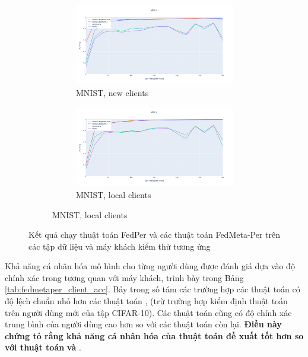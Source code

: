 \begin{figure}
    \begin{subfigure}{\textwidth}
        \centering
        \begin{subfigure}{.5\textwidth}
            \centering
            \includegraphics[width=\linewidth]{./images/mnist_per_new.png}
            \caption{MNIST, new clients}
            \label{fig:mnist_per_new}
        \end{subfigure}%
        \begin{subfigure}{.5\textwidth}
            \centering
            \includegraphics[width=\linewidth]{./images/mnist_per_old.png}
            \caption{MNIST, local clients}
            \label{fig:mnist_per_old}
        \end{subfigure}
    \end{subfigure}
    \caption{Kết quả chạy thuật toán FedPer và các thuật toán FedMeta-Per trên các tập dữ liệu và máy khách kiểm thử tương ứng}
    \label{fig:fedmetaper_acc}
\end{figure}
\clearpage
Khả năng cá nhân hóa mô hình cho từng người dùng được đánh giá dựa vào độ chính xác trong tương quan với máy khách, trình bày trong Bảng \ref{tab:fedmetaper_client_acc}. Bảy trong số tám các trường hợp các thuật toán  có độ lệch chuẩn nhỏ hơn các thuật toán ,  (trừ trường hợp kiểm định thuật toán  trên người dùng mới của tập CIFAR-10). Các thuật toán  cũng có độ chính xác trung bình của người dùng cao hơn so với các thuật toán còn lại. \textbf{Điều này chứng tỏ rằng khả năng cá nhân hóa của thuật toán đề xuất tốt hơn so với thuật toán}  \textbf{và} .

